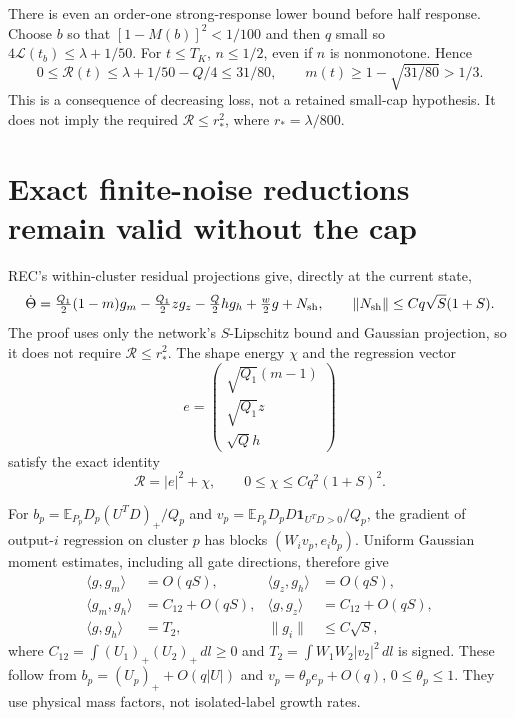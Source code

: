 \documentclass[11pt]{article}
\newcommand{\E}{\mathbb E}\newcommand{\dd}{\,d}
\begin{document}
There is even an order-one strong-response lower bound before
half response. Choose $b$ so that $[1-M(b)]^2<1/100$ and then
$q$ small so $4\mathcal L(t_b)\le\lambda+1/50$.
For $t\le T_K$, $n\le1/2$, even if $n$ is nonmonotone. Hence
\begin{equation}\label{an04cfcrv1:coarse}
 0\le\mathcal R(t)\le\lambda+1/50-Q/4\le31/80,
 \qquad m(t)\ge1-\sqrt{31/80}>1/3.
\end{equation}
This is a consequence of decreasing loss, not a retained
small-cap hypothesis. It does not imply the required
$\mathcal R\le r_*^2$, where $r_*=\lambda/800$.

\section{Exact finite-noise reductions remain valid without the cap}
REC's within-cluster residual projections give, directly at the
current state,
\begin{equation}\label{an04cfcrv1:flow}
 \dot\Theta=\tfrac{Q_1}{2}(1-m)g_m-\tfrac{Q_1}{2}zg_z
              -\tfrac Q2hg_h+\tfrac w2g+N_{\rm sh},
 \qquad \|N_{\rm sh}\|\le Cq\sqrt S(1+S).
\end{equation}
The proof uses only the network's $S$-Lipschitz bound and
Gaussian projection, so it does not require $\mathcal R\le r_*^2$.
The shape energy $\chi$ and the regression vector
\[
 e=\begin{pmatrix}\sqrt{Q_1}(m-1)\\\sqrt{Q_1}z\\\sqrt Qh\end{pmatrix}
\]
satisfy the exact identity
\begin{equation}\label{an04cfcrv1:regression}
 \mathcal R=|e|^2+\chi,\qquad 0\le\chi\le Cq^2(1+S)^2.
\end{equation}

For $b_p=\E_{P_p}D_p(U^TD)_+/Q_p$ and
$v_p=\E_{P_p}D_pD\mathbf1_{U^TD>0}/Q_p$, the gradient of
output-$i$ regression on cluster $p$ has blocks $(W_iv_p,e_ib_p)$.
Uniform Gaussian moment estimates, including all gate directions,
therefore give
\begin{align}
 \langle g,g_m\rangle&=O(qS),&
 \langle g_z,g_h\rangle&=O(qS),\nonumber\\
 \langle g_m,g_h\rangle&=C_{12}+O(qS),&
 \langle g,g_z\rangle&=C_{12}+O(qS),\nonumber\\
 \langle g,g_h\rangle&=T_2,&
 \|g_i\|&\le C\sqrt S,\label{an04cfcrv1:grams}
\end{align}
where $C_{12}=\int(U_1)_+(U_2)_+\dd l\ge0$ and
$T_2=\int W_1W_2|v_2|^2\dd l$ is signed.
These follow from $b_p=(U_p)_++O(q|U|)$ and
$v_p=\theta_pe_p+O(q)$, $0\le\theta_p\le1$.
They use physical mass factors, not isolated-label growth rates.
\end{document}
